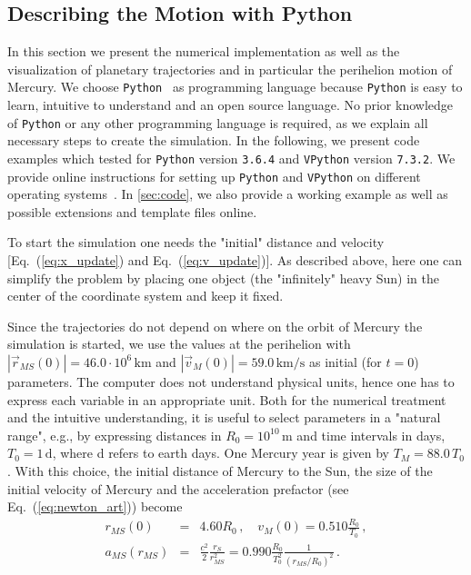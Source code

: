 \documentclass[12pt,ngerman,american]{iopart}
\newcommand{\python}[0]{\texttt{Python}}
\newcommand{\vpython}[0]{\texttt{VPython}}
\newcommand{\abs}[1]{\left\vert #1 \right\vert}
\begin{document}
\subsection{Describing the Motion with Python}

In this section we present the numerical implementation as well as the visualization of planetary trajectories and in
particular the perihelion motion of Mercury.
We choose \python{}~\cite{Python} as programming language because \python{} is easy to learn, intuitive to understand and an open source language.
No prior knowledge of \python{} or any other programming language is required, as we explain all necessary steps to create the simulation.
In the following, we present code examples which tested for \python{} version \texttt{3.6.4} and \vpython{} version \texttt{7.3.2}.
We provide online instructions for setting up \python{} and \vpython{} on different operating systems~\cite{scripts}.
In \ref{sec:code}, we also provide a working example as well as possible extensions and template files online.

To start the simulation one needs the "initial" distance and velocity [Eq.~(\ref{eq:x_update}) and Eq.~(\ref{eq:v_update})].
As described above, here one can simplify the problem by placing one object (the "infinitely" heavy Sun) in the center of the coordinate system and keep it fixed.

Since the trajectories do not depend on where on the orbit of Mercury the simulation is started, we
use the values at the perihelion with $\abs{\vec r_{MS}(0)} = 46.0 \cdot 10^6\,\mathrm{km}$ and $\abs{\vec v_M(0)} = 59.0\,\mathrm{km/s}$\cite{MercuryFactSheet} as initial (for $t=0$) parameters.
The computer does not understand physical units, hence one has to express each variable in an appropriate unit.
Both for the numerical treatment and the intuitive understanding, it is useful to select parameters in a "natural range", e.g.,
by expressing distances in $R_0 = 10^{10}\,\mathrm{m}$ and time intervals in days, $T_0 = 1\,\mathrm{d}$, where d refers to earth days. One Mercury year is given by $T_M=88.0\,T_0$.
With this choice, the initial distance of Mercury to the Sun, the size of the initial velocity of Mercury and the acceleration prefactor (see Eq.~(\ref{eq:newton_art})) become
\begin{eqnarray}
r_{MS}(0)   &=& 4.60 R_0 \, , \quad
v_{M}(0)    = 0.510 \frac{R_0}{T_0} \, ,  \\
a_{MS}(r_{MS}) &=& \frac{c^2}{2}\frac{r_S}{r_{MS}^2} = 0.990 \frac{R_0}{T_0^2} \frac{1}{{\left(r_{MS}/R_0\right)}^2}\, .
\end{eqnarray}
\end{document}
